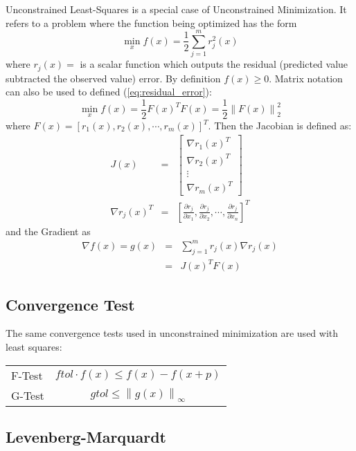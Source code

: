 \documentclass[peerreview,compsoc,onecolumn]{IEEEtran}
\newcommand{\norm}[1]{\left\lVert#1\right\rVert}
\begin{document}
Unconstrained Least-Squares is a special case of Unconstrained Minimization. It refers to a problem where the function being optimized has the form
\begin{equation}
\label{eq:residual_error}
\min\limits_{x} f(x)=\frac{1}{2}\sum^m_{j=1} r^2_j(x)
\end{equation}
where $r_j(x) = $ is a scalar function which outputs the residual (predicted value subtracted the observed value) error. By definition $f(x) \ge 0$. Matrix notation can also be used to defined (\ref{eq:residual_error}):
\begin{equation}
\min\limits_{x} f(x) =\frac{1}{2} F(x)^T F(x) = \frac{1}{2} \norm{F(x)}^2_2
\end{equation}
where $F(x) = [ r_1(x) , r_2(x) , \cdots , r_m(x) ]^T$. Then the Jacobian is defined as:
\begin{eqnarray}
J(x) &=&  \left[ \begin{array}{c}\nabla r_1(x)^T \\ \nabla r_2(x)^T \\ \vdots \\ \nabla r_m(x)^T \end{array}\right] \\
\nabla r_j(x)^T &=& \left[ \frac{\partial r_j}{\partial x_1},\frac{\partial r_j}{\partial x_2}, \cdots , \frac{\partial r_j}{\partial x_n} \right]^T
\end{eqnarray}
and the Gradient as
\begin{eqnarray}
\nabla f(x) = g(x) &=& \sum^m_{j=1}r_j(x)\nabla r_j(x) \\
&=& J(x)^T F(x)
\end{eqnarray}

\subsection{Convergence Test}

The same convergence tests used in unconstrained minimization are used with least squares:
\begin{center}
\begin{tabular}{lc}
F-Test & $ftol \cdot f(x)  \leq f(x) - f(x+p)$ \\
G-Test & $gtol \leq \norm{g(x)}_\infty$ \\
\end{tabular}
\end{center}

\subsection{Levenberg-Marquardt}
\end{document}
